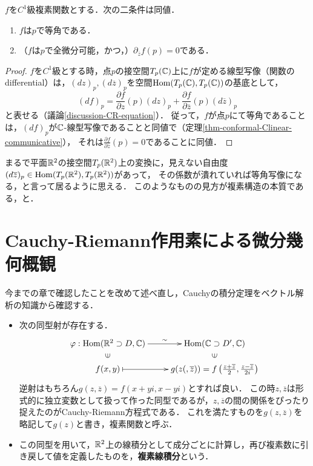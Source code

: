 \documentclass[uplatex, dvipdfmx]{jsreport}
\begin{document}
\begin{theorem}[等角写像の特徴付け]\label{thm-charactorization-of-conformal-mappings}
    $f$を$C^1$級複素関数とする．次の二条件は同値．
    \begin{enumerate}
        \item $f$は$p$で等角である．
        \item （$f$は$p$で全微分可能，かつ，）$\partial_{\overline{z}}f(p)=0$である．
    \end{enumerate}
\end{theorem}
\begin{proof}
    $f$を$C^1$級とする時，点$p$の接空間$T_p(\mathbb{C})$上に$f$が定める線型写像（関数のdifferential）は，$(dz)_p,(d\overline{z})_p$を空間$\mathrm{Hom}(T_p(\mathbb{C}),T_p(\mathbb{C}))$の基底として，
    \[ (df)_p=\frac{\partial f}{\partial z}(p)(dz)_p + \frac{\partial f}{\partial\overline{z}}(p)(d\overline{z})_p \]
    と表せる（議論\ref{discussion-CR-equation}）．
    従って，$f$が点$p$にて等角であることは，$(df)_p$が$\mathbb{C}$-線型写像であることと同値で（定理\ref{thm-conformal-Clinear-communicative}），
    それは$\frac{\partial f}{\partial\overline{z}}(p)=0$であることに同値．
\end{proof}
\begin{remark}
    まるで平面$\mathbb{R}^2$の接空間$T_p(\mathbb{R}^2)$上の変換に，見えない自由度$(d\overline{z})_p\in\mathrm{Hom}(T_p(\mathbb{R}^2),T_p(\mathbb{R}^2))$があって，
    その係数が潰れていれば等角写像になる，と言って居るように思える．
    このようなものの見方が複素構造の本質である，と．
\end{remark}

\section{Cauchy-Riemann作用素による微分幾何概観}

\begin{screen}
    今までの章で確認したことを改めて述べ直し，Cauchyの積分定理をベクトル解析の知識から確認する．
\end{screen}

\begin{definition}
    \begin{itemize}
        \item 次の同型射が存在する．
    \[\xymatrix@R-2pc{
        \varphi:\Hom(\R^2\supset D,\C)\ar[r]^-{\sim}&\Hom(\C\supset D',\C)\\
        \rotatebox{90}{$\in$}&\rotatebox{90}{$\in$}\\
        {f(x,y)}\ar@{|->}[r]&g(z(,\overline{z}))=f\left(\frac{z+\overline{z}}{2},\frac{z-\overline{z}}{2i}\right)
    }\]
    逆射はもちろん$g(z,\overline{z})=f(x+yi,x-yi)$とすれば良い．
    この時$z,\overline{z}$は形式的に独立変数として扱って作った同型であるが，$z,\overline{z}$の間の関係をぴったり捉えたのがCauchy-Riemann方程式である．
    これを満たすものを$g(z,\overline{z})$を略記して$g(z)$と書き，複素関数と呼ぶ．

    \item この同型を用いて，$\mathbb{R}^2$上の線積分として成分ごとに計算し，再び複素数に引き戻して値を定義したものを，\textbf{複素線積分}という．
    \end{itemize}
\end{definition}
\end{document}
